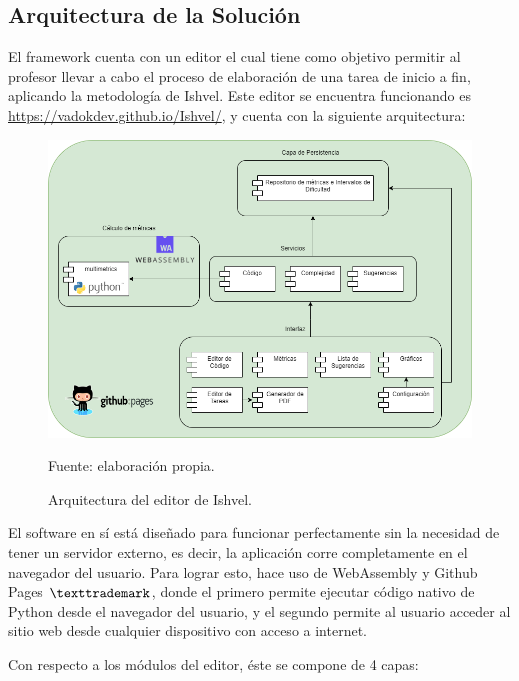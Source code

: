 \documentclass[letterpaper,12pt]{article}
\begin{document}
\subsection{Arquitectura de la Solución}

El framework cuenta con un editor el cual tiene como objetivo permitir al profesor llevar a cabo el proceso de elaboración de una tarea de inicio a fin, aplicando la metodología de Ishvel. Este editor se encuentra funcionando es \url{https://vadokdev.github.io/Ishvel/}, y cuenta con la siguiente arquitectura:
\begin{figure}[H]
  \centering
  \includegraphics[width=1\textwidth]{figures/architecture.png}
  \caption{Arquitectura del editor de Ishvel.} Fuente: elaboración propia.
  \label{img:architecture}
\end{figure}
El software en sí está diseñado para funcionar perfectamente sin la necesidad de tener un servidor externo, es decir, la aplicación corre completamente en el navegador del usuario. Para lograr esto, hace uso de WebAssembly y Github Pages $\texttrademark$, donde el primero permite ejecutar código nativo de Python desde el navegador del usuario, y el segundo permite al usuario acceder al sitio web desde cualquier dispositivo con acceso a internet.

Con respecto a los módulos del editor, éste se compone de 4 capas:
\end{document}
